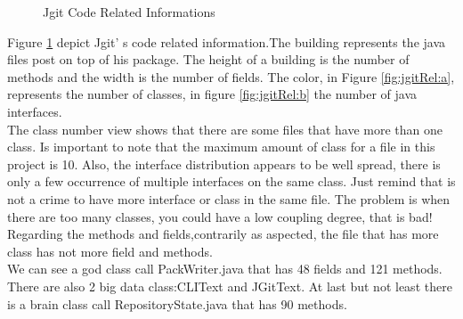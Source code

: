 \documentclass[]{usiinfbachelorproject}
\begin{document}
            \begin{figure}[h]
            \hspace*{\fill}
            
            \caption{Jgit Code Related Informations \label{fig:jgitRel}
            }
            \end{figure}


Figure \ref{fig:jgitRel} depict Jgit' s code related information.The building represents the java files post on top of his package. The height of a building is the number of methods and the width is the number of fields. The color,  in Figure \ref{fig:jgitRel:a}, represents the number of classes, in figure \ref{fig:jgitRel:b} the number of java interfaces.\\
The class number view shows that there are some files that have more than one class. Is important to note that the maximum amount of class  for a file in this project is 10.  Also, the interface distribution appears to be well spread, there is only a few occurrence of multiple interfaces on the same class. Just remind that is not a crime to have more interface or class in the same file. The problem is when there are too many classes, you could have a low coupling degree, that is bad! Regarding the methods and fields,contrarily as aspected, the file that has more class has not more field and methods.\\
We can see a god class call PackWriter.java that has 48 fields and 121 methods. There are also 2 big data class:CLIText and JGitText. At last but not least there is a brain class call RepositoryState.java that has 90 methods.
 
\end{document}

